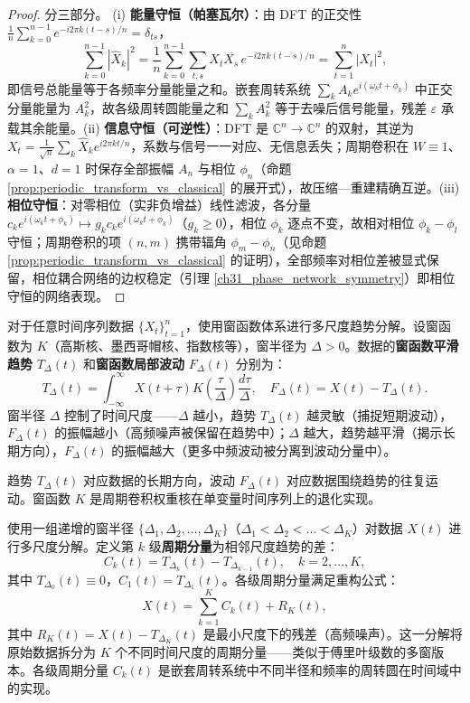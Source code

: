 \begin{proof}
分三部分。
(i) \textbf{能量守恒（帕塞瓦尔）}：由 DFT 的正交性 $\frac{1}{n}\sum_{k=0}^{n-1} e^{-i 2\pi k(t-s)/n} = \delta_{ts}$，
\[
\sum_{k=0}^{n-1} |\hat{X}_k|^2 = \frac{1}{n}\sum_{k=0}^{n-1}\sum_{t,s} X_t \overline{X_s}\, e^{-i 2\pi k(t-s)/n} = \sum_{t=1}^{n} |X_t|^2,
\]
即信号总能量等于各频率分量能量之和。嵌套周转系统 $\sum_k A_k e^{i(\omega_k t + \phi_k)}$ 中正交分量能量为 $A_k^2$，故各级周转圆能量之和 $\sum_k A_k^2$ 等于去噪后信号能量，残差 $\varepsilon$ 承载其余能量。(ii) \textbf{信息守恒（可逆性）}：DFT 是 $\mathbb{C}^n \to \mathbb{C}^n$ 的双射，其逆为 $X_t = \frac{1}{\sqrt{n}}\sum_k \hat{X}_k e^{i 2\pi kt/n}$，系数与信号一一对应、无信息丢失；周期卷积在 $W \equiv 1$、$\alpha = 1$、$d = 1$ 时保存全部振幅 $A_n$ 与相位 $\phi_n$（命题 \ref{prop:periodic_transform_vs_classical} 的展开式），故压缩—重建精确互逆。(iii) \textbf{相位守恒}：对零相位（实非负增益）线性滤波，各分量 $c_k e^{i(\omega_k t + \phi_k)} \mapsto g_k c_k e^{i(\omega_k t + \phi_k)}$（$g_k \ge 0$），相位 $\phi_k$ 逐点不变，故相对相位 $\phi_k - \phi_l$ 守恒；周期卷积的项 $(n,m)$ 携带辐角 $\phi_m - \phi_n$（见命题 \ref{prop:periodic_transform_vs_classical} 的证明），全部频率对相位差被显式保留，相位耦合网络的边权稳定（引理 \ref{ch31_phase_network_symmetry}）即相位守恒的网络表现。
\end{proof}

\begin{definition}[数据趋势的窗函数分解]\label{def:data_window_decomposition}
对于任意时间序列数据 $\{X_t\}_{t=1}^{n}$，使用窗函数体系进行多尺度趋势分解。设窗函数为 $K$（高斯核、墨西哥帽核、指数核等），窗半径为 $\Delta > 0$。数据的\textbf{窗函数平滑趋势} $T_\Delta(t)$ 和\textbf{窗函数局部波动} $F_\Delta(t)$ 分别为：
\[
T_\Delta(t) = \int_{-\infty}^{\infty} X(t+\tau) K\left(\frac{\tau}{\Delta}\right) \frac{d\tau}{\Delta}, \quad F_\Delta(t) = X(t) - T_\Delta(t).
\]
窗半径 $\Delta$ 控制了时间尺度——$\Delta$ 越小，趋势 $T_\Delta(t)$ 越灵敏（捕捉短期波动），$F_\Delta(t)$ 的振幅越小（高频噪声被保留在趋势中）；$\Delta$ 越大，趋势越平滑（揭示长期方向），$F_\Delta(t)$ 的振幅越大（更多中频波动被分离到波动分量中）。

趋势 $T_\Delta(t)$ 对应数据的长期方向，波动 $F_\Delta(t)$ 对应数据围绕趋势的往复运动。窗函数 $K$ 是周期卷积权重核在单变量时间序列上的退化实现。
\end{definition}

\begin{definition}[多窗叠加的周期分解]\label{def:multi_window_decomposition}
使用一组递增的窗半径 $\{\Delta_1, \Delta_2, \dots, \Delta_K\}$（$\Delta_1 < \Delta_2 < \dots < \Delta_K$）对数据 $X(t)$ 进行多尺度分解。定义第 $k$ 级\textbf{周期分量}为相邻尺度趋势的差：
\[
C_k(t) = T_{\Delta_k}(t) - T_{\Delta_{k-1}}(t), \quad k = 2, \dots, K,
\]
其中 $T_{\Delta_0}(t) \equiv 0$，$C_1(t) = T_{\Delta_1}(t)$。各级周期分量满足重构公式：
\[
X(t) = \sum_{k=1}^{K} C_k(t) + R_K(t),
\]
其中 $R_K(t) = X(t) - T_{\Delta_K}(t)$ 是最小尺度下的残差（高频噪声）。这一分解将原始数据拆分为 $K$ 个不同时间尺度的周期分量——类似于傅里叶级数的多窗版本。各级周期分量 $C_k(t)$ 是嵌套周转系统中不同半径和频率的周转圆在时间域中的实现。
\end{definition}

